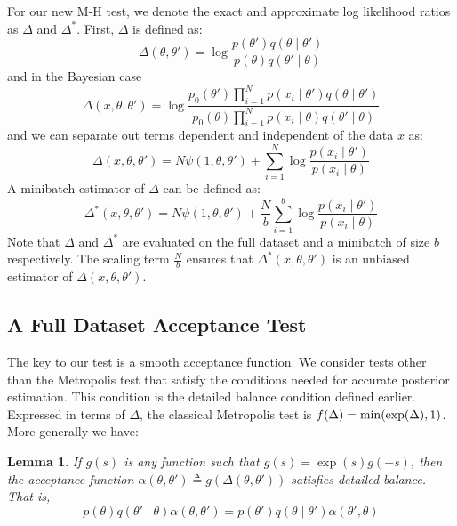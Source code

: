 \documentclass{article}
\newtheorem{lemma}{Lemma}
\begin{document}
For our new M-H test, we denote the exact and approximate log likelihood ratios as $\Delta$ and $\Delta^*$.
First, $\Delta$ is defined as:
\begin{equation}\label{eq:delta0}
  \Delta(\theta,\theta') = \log\frac{p(\theta')q(\theta\mid\theta')}{p(\theta)q(\theta'\mid\theta)}
\end{equation}
and in the Bayesian case
\begin{equation}\label{eq:delta1}
\Delta(x,\theta,\theta')  =
\log \frac{p_0(\theta')\prod_{i=1}^N p(x_i \mid \theta')q(\theta \mid
  \theta')}{p_0(\theta)\prod_{i=1}^N p(x_i \mid \theta)q(\theta' \mid\theta)}
  \end{equation}
and we can separate out terms dependent and independent of the data $x$ as:
\begin{equation}\label{eq:delta2}
\Delta(x,\theta,\theta') = N\psi(1,\theta,\theta') + \sum_{i=1}^N\log\frac{p(x_i\mid\theta')}{p(x_i\mid\theta)}
\end{equation}
A minibatch estimator of $\Delta$ can be defined as:
\begin{equation}\label{eq:delta3}
    \Delta^*(x,\theta,\theta') =
N\psi(1,\theta,\theta') + \frac{N}{b}\sum_{i=1}^b\log\frac{p(x_i\mid\theta')}{p(x_i\mid\theta)}
\end{equation}
Note that $\Delta$ and $\Delta^*$ are evaluated on the full dataset and a minibatch of size $b$
respectively. The scaling term $\frac{N}{b}$ ensures that $\Delta^*(x,\theta,\theta')$ is an
unbiased estimator of $\Delta(x,\theta,\theta')$.

\subsection{A Full Dataset Acceptance Test}\label{ssec:deltas_full}

The key to our test is a smooth acceptance function.  We consider tests other than the Metropolis
test that satisfy the conditions needed for accurate posterior estimation. This condition is
the detailed balance condition defined earlier. Expressed in terms of $\Delta$, the
classical Metropolis test is $f(\Delta) = {\rm min}(\exp(\Delta),1)$. More generally we have:

\begin{lemma}\label{lem:detailed_balance}
  If $g(s)$ is any function such that $g(s) = \exp(s) g(-s)$, then the acceptance function $\alpha(\theta,\theta') \triangleq  g(\Delta(\theta,\theta'))$ satisfies detailed balance. That is,
  \begin{equation}\label{detbal}
    p(\theta)q(\theta'\mid\theta)\alpha(\theta,\theta') = p(\theta')q(\theta\mid\theta')\alpha(\theta',\theta)
    \end{equation}

\end{lemma}
\end{document}
